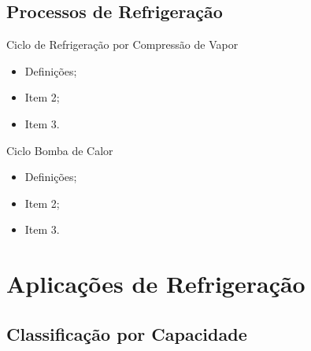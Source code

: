 \subsection{Processos de Refrigeração}

    \begin{frame}{Ciclo de Refrigeração por Compressão de Vapor}\vspace*{-0em}
        \begin{itemize}
            \item<1-> Definições;
            \item<1-> Item 2;
            \item<1-> Item 3.
        \end{itemize}
    \end{frame}

    \begin{frame}{Ciclo Bomba de Calor}\vspace*{-0em}
        \begin{itemize}
            \item<1-> Definições;
            \item<1-> Item 2;
            \item<1-> Item 3.
        \end{itemize}
    \end{frame}

\section{Aplicações de Refrigeração}

\subsection{Classificação por Capacidade}

